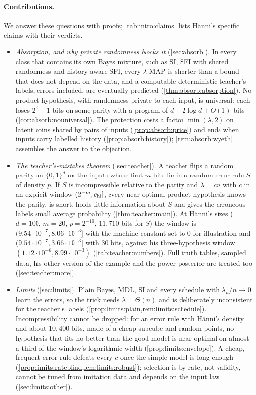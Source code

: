 \paragraph{Contributions.} We answer these questions with proofs; \cref{tab:intro:claims} lists H\"anni's specific claims with their verdicts.
\begin{itemize}
\item \emph{Absorption, and why private randomness blocks it} (\cref{sec:absorb}). In every class that contains its own Bayes mixture, such as SI, SFI with shared randomness and history-aware SFI, every $\lambda$-MAP is shorter than a bound that does not depend on the data, and a computable deterministic teacher's labels, errors included, are eventually predicted (\cref{thm:absorb:absorption}). No product hypothesis, with randomness private to each input, is universal: each loses $2^d-1$ bits on some parity with a program of $d+2\log d+O(1)$ bits (\cref{cor:absorb:nouniversal}). The protection costs a factor $\min(\lambda,2)$ on latent coins shared by pairs of inputs (\cref{prop:absorb:price}) and ends when inputs carry labelled history (\cref{prop:absorb:history}); \cref{rem:absorb:wyeth} assembles the answer to the objection.
\item \emph{The teacher's-mistakes theorem} (\cref{sec:teacher}). A teacher flips a random parity on $\{0,1\}^d$ on the inputs whose first $m$ bits lie in a random error rule $S$ of density $p$. If $S$ is incompressible relative to the parity and $\lambda=cn$ with $c$ in an explicit window $(2^{-m},c_{\rm hi}]$, every near-optimal product hypothesis knows the parity, is short, holds little information about $S$ and gives the erroneous labels small average probability (\cref{thm:teacher:main}). At H\"anni's sizes ($d=100$, $m=20$, $p=2^{-10}$, $11{,}710$ bits for $S$) the window is $(9.54\cdot10^{-7},8.06\cdot10^{-3}]$ with the machine constant set to $0$ for illustration and $(9.54\cdot10^{-7},3.66\cdot10^{-3}]$ with $30$ bits, against his three-hypothesis window $(1.12\cdot10^{-6},8.99\cdot10^{-3})$ (\cref{tab:teacher:numbers}). Full truth tables, sampled data, his other version of the example and the power posterior are treated too (\cref{sec:teacher:more}).
\item \emph{Limits} (\cref{sec:limits}). Plain Bayes, MDL, SI and every schedule with $\lambda_n/n\to0$ learn the errors, so the trick needs $\lambda=\Theta(n)$ and is deliberately inconsistent for the teacher's labels (\cref{prop:limits:plain,rem:limits:schedule}). Incompressibility cannot be dropped: for an error rule with H\"anni's density and about $10{,}400$ bits, made of a cheap subcube and random points, no hypothesis that fits no better than the good model is near-optimal on almost a third of the window's logarithmic width (\cref{prop:limits:envelope}). A cheap, frequent error rule defeats every $c$ once the simple model is long enough (\cref{prop:limits:rateblind,lem:limits:robust}); selection is by rate, not validity, cannot be tuned from imitation data and depends on the input law (\cref{sec:limits:other}).

\end{itemize}
